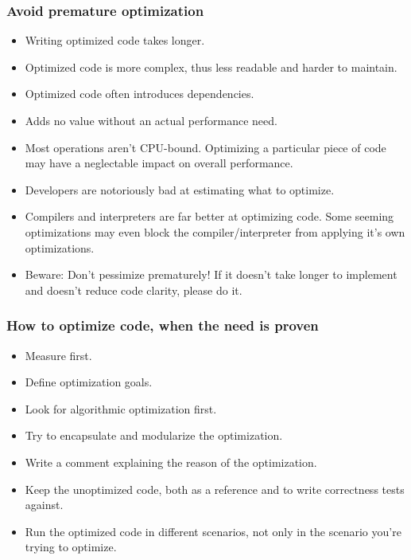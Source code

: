 \begin{frame}
	\frametitle{Avoid premature optimization}
	\begin{itemize}[<+-| highlight@+>]
		\item Writing optimized code takes longer.
		\item Optimized code is more complex, thus less readable and harder to maintain.
		\item Optimized code often introduces dependencies.
		\item Adds no value without an actual performance need.
		\item Most operations aren't CPU-bound. Optimizing a particular piece of code may have a neglectable impact on overall performance.
		\item Developers are notoriously bad at estimating what to optimize.
		\item Compilers and interpreters are far better at optimizing code. Some seeming optimizations may even block the compiler/interpreter from applying it's own optimizations.
		\item Beware: Don't pessimize prematurely! If it doesn't take longer to implement and doesn't reduce code clarity, please do it.
	\end{itemize}
\end{frame}


\begin{frame}
	\frametitle{How to optimize code, when the need is proven}
	\begin{itemize}[<+-| highlight@+>]
		\item Measure first.
		\item Define optimization goals.
		\item Look for algorithmic optimization first.
		\item Try to encapsulate and modularize the optimization.
		\item Write a comment explaining the reason of the optimization.
		\item Keep the unoptimized code, both as a reference and to write correctness tests against.
		\item Run the optimized code in different scenarios, not only in the scenario you're trying to optimize.
	\end{itemize}
\end{frame}

